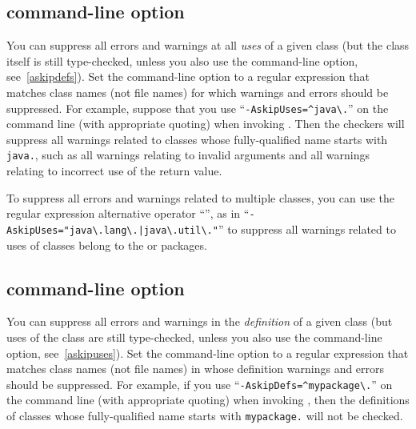 



\subsection{ command-line option\label{askipuses}}

You can suppress all errors and warnings at all \emph{uses} of a given
class (but the class itself is still type-checked, unless you also use
the  command-line option, see~\ref{askipdefs}).
Set the  command-line option to a
regular expression that matches class names (not file names) for which warnings and errors
should be suppressed.  For example, suppose that you use
``{\codesize\verb|-AskipUses=^java\.|}'' on the command line
(with appropriate quoting) when invoking
.  Then the checkers will suppress all warnings related to
classes whose fully-qualified name starts with \codesize\verb|java.|, such
as all warnings relating to invalid arguments and all warnings relating to
incorrect use of the return value.

To suppress all errors and warnings related to multiple classes, you can use
the regular expression alternative operator ``\code{|}'', as in
``{\codesize\verb+-AskipUses="java\.lang\.|java\.util\."+}'' to suppress
all warnings related to uses of classes belong to the  or
 packages.


\subsection{ command-line option\label{askipdefs}}

You can suppress all errors and warnings in the \emph{definition} of a given
class (but uses of the class are still type-checked, unless you also use
the  command-line option, see~\ref{askipuses}).
Set the  command-line option to a
regular expression that matches class names (not file names) in whose definition warnings and errors
should be suppressed.  For example, if you use
``{\codesize\verb|-AskipDefs=^mypackage\.|}'' on the command line
(with appropriate quoting) when invoking
, then the definitions of 
classes whose fully-qualified name starts with \codesize\verb|mypackage.|
will not be checked.


